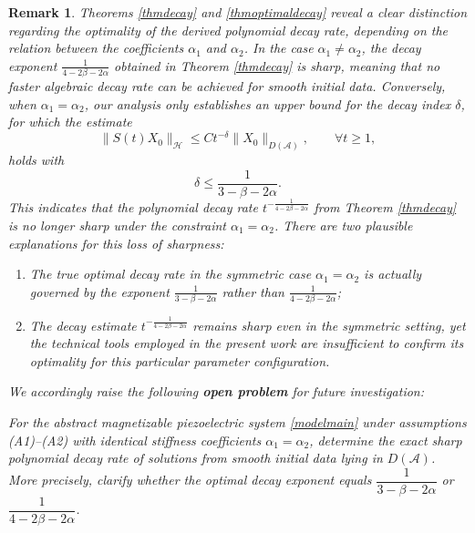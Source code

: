 \documentclass[12pt,reqno]{article}
\newtheorem{remark}[theorem]{Remark}
\begin{document}
\begin{remark}\label{rem-sharpness}
Theorems \ref{thmdecay} and \ref{thmoptimaldecay} reveal a clear distinction regarding the optimality of the derived polynomial decay rate, depending on the relation between the coefficients $\alpha_1$ and $\alpha_2$. In the case $\alpha_1 \neq \alpha_2$, the decay exponent $\frac{1}{4-2\beta-2\alpha}$ obtained in Theorem \ref{thmdecay} is sharp, meaning that no faster algebraic decay rate can be achieved for smooth initial data. Conversely, when $\alpha_1 = \alpha_2$, our analysis only establishes an upper bound for the decay index $\delta$, for which the estimate
\begin{equation}\label{remarkeq1}
 \|S(t)X_0\|_{\mathcal{H}} \leq C t^{-\delta} \|X_0\|_{D(\mathcal{A})}, \qquad \forall t \ge 1,
\end{equation}
holds with
\[
\delta \le \frac{1}{3-\beta-2\alpha}.
\]
This indicates that the polynomial decay rate $t^{-\frac{1}{4-2\beta-2\alpha}}$ from Theorem \ref{thmdecay} is no longer sharp under the constraint $\alpha_1=\alpha_2$. There are two plausible explanations for this loss of sharpness:
\begin{enumerate}
\item The true optimal decay rate in the symmetric case $\alpha_1=\alpha_2$ is actually governed by the exponent $\frac{1}{3-\beta-2\alpha}$ rather than $\frac{1}{4-2\beta-2\alpha}$;
\item The decay estimate $t^{-\frac{1}{4-2\beta-2\alpha}}$ remains sharp even in the symmetric setting, yet the technical tools employed in the present work are insufficient to confirm its optimality for this particular parameter configuration.
\end{enumerate}

We accordingly raise the following {\bf open problem} for future investigation:

For the abstract magnetizable piezoelectric system \eqref{modelmain} under assumptions (A1)--(A2) with identical stiffness coefficients $\alpha_1=\alpha_2$, determine the exact sharp polynomial decay rate of solutions from smooth initial data lying in $D(\mathcal{A})$. More precisely, clarify whether the optimal decay exponent equals $\dfrac{1}{3-\beta-2\alpha}$ or $\dfrac{1}{4-2\beta-2\alpha}$.
\end{remark}
\end{document}
